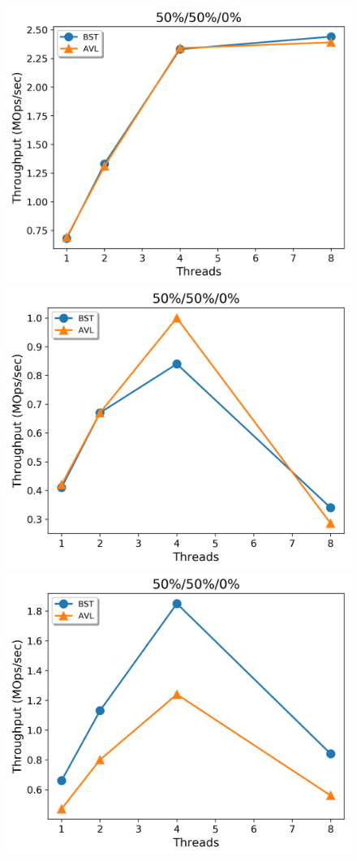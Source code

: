 \documentclass[conference]{IEEEtran}
\theoremstyle{definition}
\theoremstyle{theorem}
\begin{document}
\begin{figure}[t]
\begin{minipage}{0.33\textwidth}
 {\includegraphics[width =1\linewidth]{figures/conc-50-50-0.png}}
 {\includegraphics[width =1\linewidth]{figures/stm1-50-50-0.png}}
 {\includegraphics[width =1\linewidth]{figures/stm2-50-50-0.png}}

\end{minipage}
\end{figure}
\end{document}
